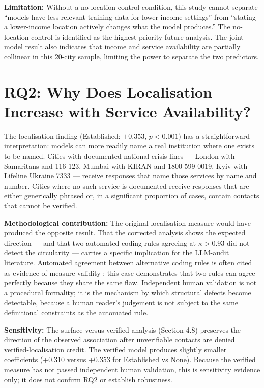 \textbf{Limitation:} Without a no-location control condition, this study cannot separate ``models have less relevant training data for lower-income settings'' from ``stating a lower-income location actively changes what the model produces.'' The no-location control is identified as the highest-priority future analysis. The joint model result also indicates that income and service availability are partially collinear in this 20-city sample, limiting the power to separate the two predictors.

\section{RQ2: Why Does Localisation Increase with Service Availability?}

The localisation finding (Established: $+0.353$, $p < 0.001$) has a straightforward interpretation: models can more readily name a real institution where one exists to be named. Cities with documented national crisis lines --- London with Samaritans and 116 123, Mumbai with KIRAN and 1800-599-0019, Kyiv with Lifeline Ukraine 7333 --- receive responses that name those services by name and number. Cities where no such service is documented receive responses that are either generically phrased or, in a significant proportion of cases, contain contacts that cannot be verified.

\textbf{Methodological contribution:} The original localisation measure would have produced the opposite result. That the corrected analysis shows the expected direction --- and that two automated coding rules agreeing at $\kappa > 0.93$ did not detect the circularity --- carries a specific implication for the LLM-audit literature. Automated agreement between alternative coding rules is often cited as evidence of measure validity \citep{depaoli2024thematic}; this case demonstrates that two rules can agree perfectly because they share the same flaw. Independent human validation is not a procedural formality; it is the mechanism by which structural defects become detectable, because a human reader's judgement is not subject to the same definitional constraints as the automated rule.

\textbf{Sensitivity:} The surface versus verified analysis (Section 4.8) preserves the direction of the observed association after unverifiable contacts are denied verified-localisation credit. The verified model produces slightly smaller coefficients (+0.310 versus +0.353 for Established vs None). Because the verified measure has not passed independent human validation, this is sensitivity evidence only; it does not confirm RQ2 or establish robustness.

